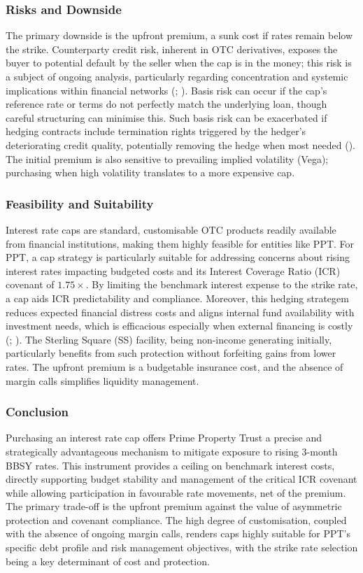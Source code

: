 \documentclass[11pt, a4paper, british]{article}
\begin{document}
\subsubsection{Risks and Downside}
The primary downside is the upfront premium, a sunk cost if rates remain below the strike. Counterparty credit risk, inherent in OTC derivatives, exposes the buyer to potential default by the seller when the cap is in the money; this risk is a subject of ongoing analysis, particularly regarding concentration and systemic implications within financial networks (\cite{bs}; \cite{ngs}). Basis risk can occur if the cap's reference rate or terms do not perfectly match the underlying loan, though careful structuring can minimise this. Such basis risk can be exacerbated if hedging contracts include termination rights triggered by the hedger's deteriorating credit quality, potentially removing the hedge when most needed (\cite{bt}). The initial premium is also sensitive to prevailing implied volatility (Vega); purchasing when high volatility translates to a more expensive cap.

\subsubsection{Feasibility and Suitability}
Interest rate caps are standard, customisable OTC products readily available from financial institutions, making them highly feasible for entities like PPT. For PPT, a cap strategy is particularly suitable for addressing concerns about rising interest rates impacting budgeted costs and its Interest Coverage Ratio (ICR) covenant of $1.75 \times$. By limiting the benchmark interest expense to the strike rate, a cap aids ICR predictability and compliance. Moreover, this hedging strategem reduces expected financial distress costs and aligns internal fund availability with investment needs, which is efficacious especially when external financing is costly (\cite{gms}; \cite{abd}). The Sterling Square (SS) facility, being non-income generating initially, particularly benefits from such protection without forfeiting gains from lower rates. The upfront premium is a budgetable insurance cost, and the absence of margin calls simplifies liquidity management.

\subsubsection{Conclusion}
Purchasing an interest rate cap offers Prime Property Trust a precise and strategically advantageous mechanism to mitigate exposure to rising 3-month BBSY rates. This instrument provides a ceiling on benchmark interest costs, directly supporting budget stability and management of the critical ICR covenant while allowing participation in favourable rate movements, net of the premium. The primary trade-off is the upfront premium against the value of asymmetric protection and covenant compliance. The high degree of customisation, coupled with the absence of ongoing margin calls, renders caps highly suitable for PPT's specific debt profile and risk management objectives, with the strike rate selection being a key determinant of cost and protection.
\end{document}
